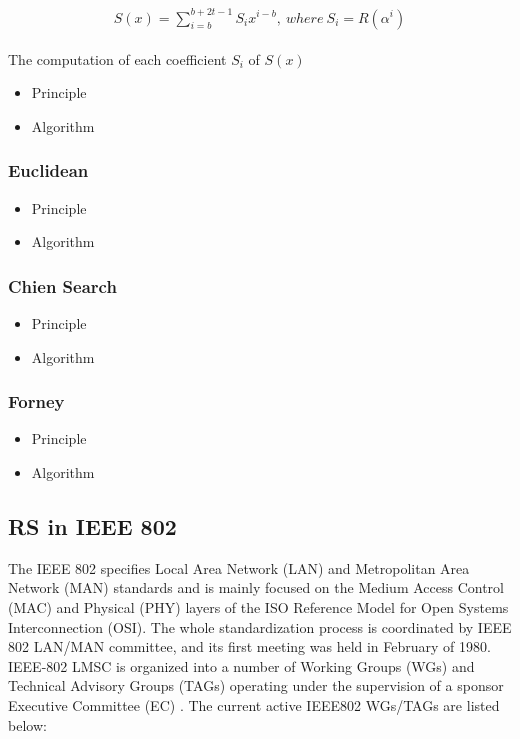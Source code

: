 \documentclass[conference]{IEEEtran}
\begin{document}
\begin{align}
\label{eq:5}
\begin{gathered}
S(x) = \sum_{i=b}^{b+2t-1}S_{i}x^{i-b}, \ where\ S_i = R(\alpha^i)
\end{gathered}
\end{align}

The computation of each coefficient $S_i$ of $S(x)$ 


\begin{itemize}
	\item Principle
	\item Algorithm
\end{itemize}
\subsubsection{Euclidean}
\begin{itemize}
	\item Principle
	\item Algorithm
\end{itemize}
\subsubsection{Chien Search}
\begin{itemize}
	\item Principle
	\item Algorithm
\end{itemize}
\subsubsection{Forney}
\begin{itemize}
	\item Principle
	\item Algorithm
\end{itemize}
\subsection{RS in IEEE 802}
\par The IEEE 802 specifies Local Area Network (LAN) and Metropolitan Area Network (MAN) standards and is mainly focused on the Medium Access Control (MAC) and Physical (PHY) layers of the ISO Reference Model for Open Systems Interconnection (OSI). The whole standardization process is coordinated by IEEE 802 LAN/MAN committee, and its first meeting was held in February of 1980. IEEE-802 LMSC is organized into a number of Working Groups (WGs) and Technical Advisory Groups (TAGs) operating under the supervision of a sponsor Executive Committee (EC) \cite{b10}. The current active IEEE802 WGs/TAGs are listed below:
\end{document}

